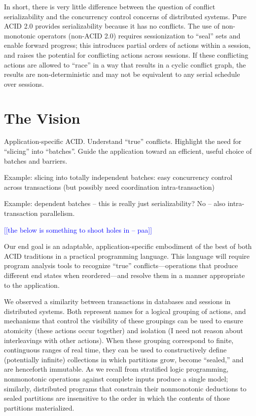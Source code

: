 \documentclass{sig-alternate}
\newcommand{\paa}[1]{{\textcolor{blue}{[[#1 -- paa]]}}}
\begin{document}
In short, there is very little difference between the question of conflict
serializability and the concurrency control concerns of distributed systems.
Pure ACID 2.0 provides serializability because it has no conflicts.  The use of
non-monotonic operators (non-ACID 2.0) requires sessionization to ``seal'' sets
and enable forward progress; this introduces partial orders of actions within a
session, and raises the potential for conflicting actions across sessions.  If
these conflicting actions are allowed to ``race'' in a way that results in a
cyclic conflict graph, the results are non-deterministic and may not be
equivalent to any serial schedule over sessions.


\section{The Vision}
Application-specific ACID.  Understand ``true'' conflicts.  Highlight the need
for ``slicing'' into ``batches''.  Guide the application toward an efficient,
useful choice of batches and barriers.

Example: slicing into totally independent batches: easy concurrency control
across transactions (but possibly need coordination intra-transaction)

Example: dependent batches -- this is really just serializability?  No -- also
intra-transaction parallelism.

\paa{the below is something to shoot holes in}

Our end goal is an adaptable, application-specific embodiment of the best of both ACID traditions in a practical programming language. This language will require program analysis tools to recognize ``true'' conflicts---operations that produce different end states when reordered---and resolve them in a manner appropriate to the application.

We observed a similarity between transactions in databases and sessions in distributed systems.  Both represent names for a logical grouping of actions, and mechanisms that control the visibility of these groupings can be used to ensure atomicity (these actions occur together) and isolation (I need not reason about interleavings with other actions).  When these grouping correspond to finite, continguous ranges of real time, they can be used to constructively define (potentially infinite) collections in which partitions grow, become ``sealed,'' and are henceforth immutable.  As we recall from stratified logic programming, nonmonotonic operations against complete inputs produce a single model; similarly, distributed programs that constrain their nonmonotonic deductions to sealed partitions are insensitive to the order in which the contents of those partitions materialized.
 
\end{document}
